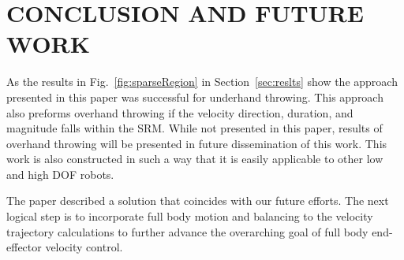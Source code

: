 \section{CONCLUSION AND FUTURE WORK}\label{sec:conc}

As the results in Fig.~\ref{fig:sparseRegion} in Section~\ref{sec:reslts} show the approach presented in this paper was successful for underhand throwing.  This approach also preforms overhand throwing if the velocity direction, duration, and magnitude falls within the SRM.  While not presented in this paper, results of overhand throwing will be presented in future dissemination of this work.  This work is also constructed in such a way that it is easily applicable to other low and high DOF robots.

The paper described a solution that coincides with our future efforts.  The next logical step is to incorporate full body motion and balancing to the velocity trajectory calculations to further advance the overarching goal of full body end-effector velocity control.



